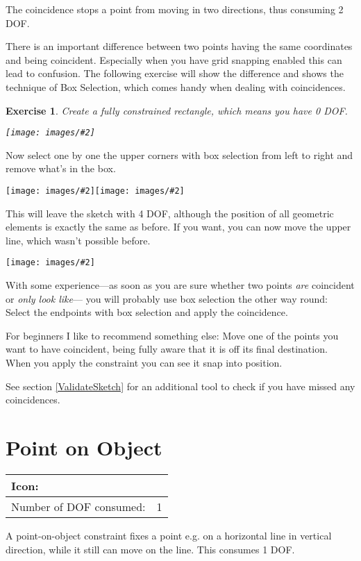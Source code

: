 \documentclass[12pt,titlepage]{article}
\newcommand{\icon}[1]{\raisebox{-1em}{\rule{0pt}{27pt}\texttt{[image: images/\#1]}}}
\newcommand{\img}[2]{\vspace{2ex}\noindent\texttt{[image: images/\#2]}}
\newcommand{\dofConsumed}{Number of DOF consumed:}
\newtheorem{Exercise}{Exercise}
\begin{document}
The coincidence stops a point from moving in two directions, thus consuming 2 DOF.

There is an important difference between two points having the same
coordinates and being coincident. Especially when you have grid snapping
enabled this can lead to confusion. The following exercise will show the difference
and shows the technique of Box Selection, which comes handy when dealing with
coincidences.

\begin{Exercise}
\label{ExampleBoxSelection}
Create a fully constrained rectangle, which means you have 0 DOF.

\img{}{Coincidence1}
\end{Exercise}
Now select one by one the upper corners with box selection from left to right and
remove what's in the box.

\img{scale=0.9}{Coincidence2}\hspace{2em}\img{scale=0.9}{Coincidence3}

This will leave the sketch with 4 DOF, although the position of all geometric
elements is exactly the same as before. If you want, you can now move the upper line,
which wasn't possible before.

\img{scale=0.7}{Coincidence4}

With some experience---as soon as you are sure whether two points \emph{are} coincident
or \emph{only look like}--- you will probably use box selection the other way
round: Select the endpoints with box selection and apply the coincidence.

For beginners I like to recommend something else: Move one of the points you want to
have coincident, being fully aware that it is off its final destination. When you
apply the constraint you can see it snap into position.

See section \vref{ValidateSketch} for an additional tool to check if you have missed any
coincidences.


\section{Point on Object}
\label{PointOnObject}
\begin{tabular}{|l|l|}
\hline
Icon: & \icon{Constraint_PointOnObject}\\
\hline
\dofConsumed & 1 \\
\hline
\end{tabular}

A point-on-object constraint fixes a point e.g. on a horizontal line in vertical direction, while it still
can move on the line. This consumes 1 DOF.
\end{document}

